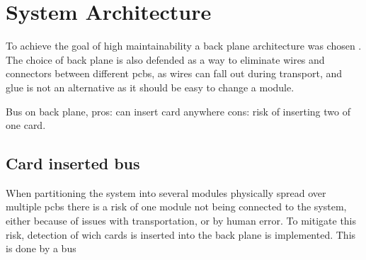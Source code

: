 \section{System Architecture}
To achieve the goal of high maintainability a back plane architecture was chosen . The choice of back plane is also defended as a way to eliminate wires and connectors between different pcbs, as wires can fall out during transport, and glue is not an alternative as it should be easy to change a module.

Bus on back plane, pros: can insert card anywhere cons: risk of inserting two of one card.


\subsection{Card inserted bus}
When partitioning the system into several modules physically spread over multiple pcbs there is a risk of one module not being connected to the system, either because of issues with transportation, or by human error. To mitigate this risk, detection of wich cards is inserted into the back plane is implemented. This is done by a bus   
